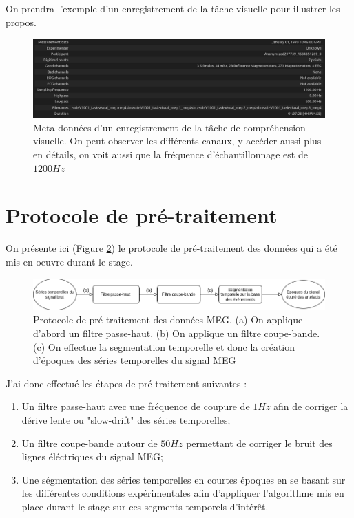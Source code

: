 \vspace{2ex}
On prendra l'exemple d'un enregistrement de la tâche visuelle pour illustrer les propos.

\begin{figure}[!ht]
    \centering
    \includegraphics[width=16cm]{raw_info.png}
    \caption{Meta-données d'un enregistrement de la tâche de compréhension visuelle. On peut observer les différents canaux, y accéder aussi plus en détails, on voit aussi que la fréquence d'échantillonnage est de $1200 Hz$}
    \label{fig3.1}
\end{figure}
\section{Protocole de pré-traitement}

On présente ici (Figure \ref{fig3.2}) le protocole de pré-traitement des données qui a été mis en oeuvre durant le stage. 

\begin{figure}[!ht]
    \centering
    \includegraphics[width=15cm]{schema_pre_traitement.png}
    \caption{Protocole de pré-traitement des données MEG. (a) On applique d'abord un filtre passe-haut. (b) On applique un filtre coupe-bande. (c) On effectue la segmentation temporelle et donc la création d'époques des séries temporelles du signal MEG}
    \label{fig3.2}
\end{figure}

J'ai donc effectué les étapes de pré-traitement suivantes :

\begin{enumerate}
	\item Un filtre passe-haut avec une fréquence de coupure de $1 Hz$ afin de corriger la dérive lente ou "slow-drift" des séries temporelles;
	\item Un filtre coupe-bande autour de $50 Hz$ permettant de corriger le bruit des lignes éléctriques du signal MEG;
	\item Une ségmentation des séries temporelles en courtes époques en se basant sur les différentes conditions expérimentales afin d'appliquer l'algorithme mis en place durant le stage sur ces segments temporels d'intérêt.
\end{enumerate}


